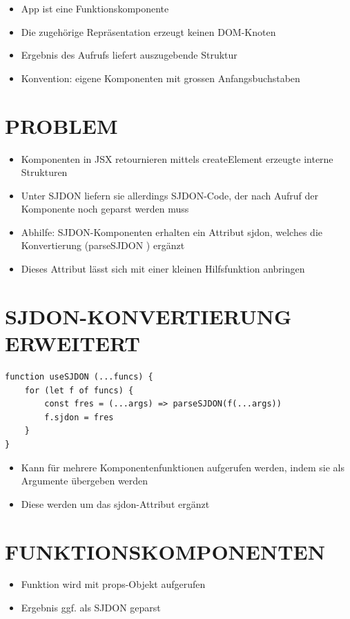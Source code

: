 \documentclass[10pt]{article}
\begin{document}
\begin{itemize}
  \item App ist eine Funktionskomponente
  \item Die zugehörige Repräsentation erzeugt keinen DOM-Knoten
  \item Ergebnis des Aufrufs liefert auszugebende Struktur
  \item Konvention: eigene Komponenten mit grossen Anfangsbuchstaben
\end{itemize}

\section*{PROBLEM}
\begin{itemize}
  \item Komponenten in JSX retournieren mittels createElement erzeugte interne Strukturen
  \item Unter SJDON liefern sie allerdings SJDON-Code, der nach Aufruf der Komponente noch geparst werden muss
  \item Abhilfe: SJDON-Komponenten erhalten ein Attribut sjdon, welches die Konvertierung (parseSJDON ) ergänzt
  \item Dieses Attribut lässt sich mit einer kleinen Hilfsfunktion anbringen
\end{itemize}

\section*{SJDON-KONVERTIERUNG ERWEITERT}
\begin{verbatim}
function useSJDON (...funcs) {
    for (let f of funcs) {
        const fres = (...args) => parseSJDON(f(...args))
        f.sjdon = fres
    }
}
\end{verbatim}

\begin{itemize}
  \item Kann für mehrere Komponentenfunktionen aufgerufen werden, indem sie als Argumente übergeben werden
  \item Diese werden um das sjdon-Attribut ergänzt
\end{itemize}

\section*{FUNKTIONSKOMPONENTEN}
\begin{itemize}
  \item Funktion wird mit props-Objekt aufgerufen
  \item Ergebnis ggf. als SJDON geparst
\end{itemize}
\end{document}
